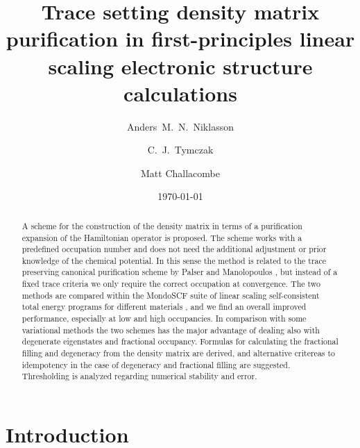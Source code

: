 \commentoutA{\documentclass[prb,aps,twocolumn,twocolumngrid,secnumarabic,superbib,hyperref]{revtex4}}
\begin{document}
\date{\today}

\title{Trace setting density matrix purification in first-principles
linear scaling electronic structure calculations}

\author{Anders~M.~N.~Niklasson}
\author{C.~J.~Tymczak}
\author{Matt Challacombe}

\begin{abstract}
A scheme for the construction of the density matrix in terms of
a purification expansion of the Hamiltonian operator is proposed. The scheme
works with a predefined occupation number and does not need
the additional adjustment or prior knowledge of the chemical potential.
In this sense the method is related to the trace preserving canonical 
purification scheme by Palser and Manolopoulos \cite{McWeeny60,Palser98}, 
but instead of a fixed trace criteria we only require the correct
occupation at convergence. The two methods are
compared within the MondoSCF suite of linear scaling self-consistent total energy
programs for different materials \cite{Mondo}, and we find an overall improved performance,
especially at low and high occupancies. In comparison
with some variational methods the two schemes has the major advantage of
dealing also with degenerate eigenstates and fractional occupancy. 
Formulas for calculating the fractional filling and degeneracy from 
the density matrix are derived, and alternative critereas to idempotency
in the case of degeneracy and fractional filling are suggested.
Thresholding is analyzed regarding numerical stability and error.
%
%
\end{abstract}

\maketitle

\section{Introduction}
\end{document}
